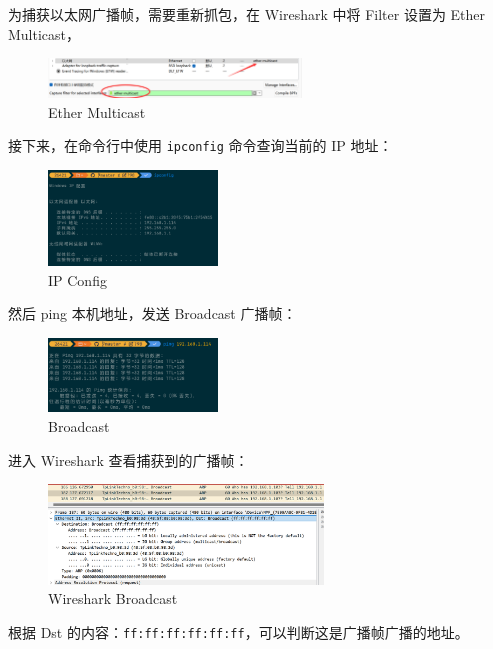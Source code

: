 \documentclass[14pt,a4paper,UTF8,twoside]{article}
\begin{document}
为捕获以太网广播帧，需要重新抓包，在 Wireshark 中将 Filter 设置为 Ether Multicast，

\begin{figure}[H]
  \centering
  \includegraphics[width=0.6\textwidth]{lab2/Ether multicast.png}
  \caption{Ether Multicast}
\end{figure}

接下来，在命令行中使用 \texttt{ipconfig} 命令查询当前的 IP 地址：

\begin{figure}[H]
  \centering
  \includegraphics[width=0.4\textwidth]{lab2/ip.png}
  \caption{IP Config}
\end{figure}

然后 ping 本机地址，发送 Broadcast 广播帧：

\begin{figure}[H]
  \centering
  \includegraphics[width=0.4\textwidth]{lab2/broadcast.png}
  \caption{Broadcast}
\end{figure}

进入 Wireshark 查看捕获到的广播帧：

\begin{figure}[H]
  \centering
  \includegraphics[width=0.65\textwidth]{lab2/wiresharkbroadcast.png}
  \caption{Wireshark Broadcast}
  \label{fig:wiresharkbroadcast}
\end{figure}

根据 Dst 的内容：\texttt{ff:ff:ff:ff:ff:ff}，可以判断这是广播帧广播的地址。
\end{document}
